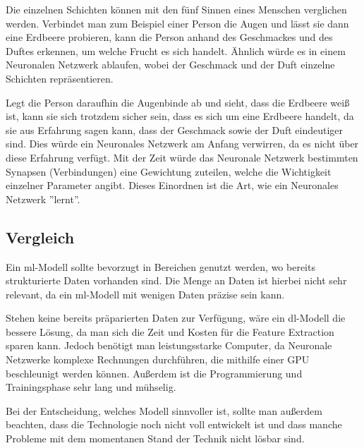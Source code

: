 Die einzelnen Schichten können mit den fünf Sinnen eines Menschen verglichen werden. Verbindet man zum Beispiel einer Person die Augen und lässt sie dann eine Erdbeere probieren, kann die Person anhand des Geschmackes und des Duftes erkennen, um welche Frucht es sich handelt. Ähnlich würde es in einem Neuronalen Netzwerk ablaufen, wobei der Geschmack und der Duft einzelne Schichten repräsentieren.

Legt die Person daraufhin die Augenbinde ab und sieht, dass die Erdbeere weiß ist, kann sie sich trotzdem sicher sein, dass es sich um eine Erdbeere handelt, da sie aus Erfahrung sagen kann, dass der Geschmack sowie der Duft eindeutiger sind. Dies würde ein Neuronales Netzwerk am Anfang verwirren, da es nicht über diese Erfahrung verfügt. Mit der Zeit würde das Neuronale Netzwerk bestimmten Synapsen (Verbindungen) eine Gewichtung zuteilen, welche die Wichtigkeit einzelner Parameter angibt. Dieses Einordnen ist die Art, wie ein Neuronales Netzwerk ''lernt''. \cite{NN}

\subsection{Vergleich}

Ein \gls{ml}-Modell sollte bevorzugt in Bereichen genutzt werden, wo bereits strukturierte Daten vorhanden sind. Die Menge an Daten ist hierbei nicht sehr relevant, da ein \gls{ml}-Modell mit wenigen Daten präzise sein kann.

Stehen keine bereits präparierten Daten zur Verfügung, wäre ein \gls{dl}-Modell die bessere Lösung, da man sich die Zeit und Kosten für die Feature Extraction sparen kann. Jedoch benötigt man leistungsstarke Computer, da Neuronale Netzwerke komplexe Rechnungen durchführen, die mithilfe einer GPU beschleunigt werden können. Außerdem ist die Programmierung und Trainingsphase sehr lang und mühselig. \cite{MLvsDL}

Bei der Entscheidung, welches Modell sinnvoller ist, sollte man außerdem beachten, dass die Technologie noch nicht voll entwickelt ist und dass manche Probleme mit dem momentanen Stand der Technik nicht lösbar sind.